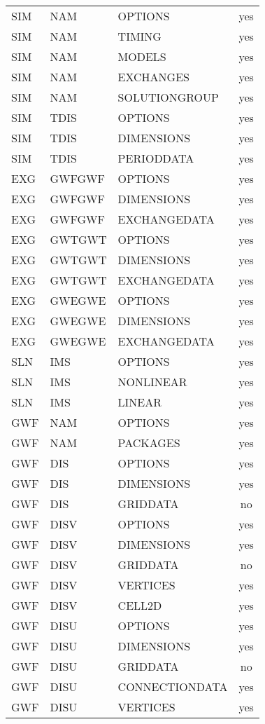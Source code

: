 \begin{longtable}{p{1.5cm} p{1.5cm} p{3cm} c}
\hline
SIM & NAM & OPTIONS & yes \\ 
SIM & NAM & TIMING & yes \\ 
SIM & NAM & MODELS & yes \\ 
SIM & NAM & EXCHANGES & yes \\ 
SIM & NAM & SOLUTIONGROUP & yes \\ 
\hline
SIM & TDIS & OPTIONS & yes \\ 
SIM & TDIS & DIMENSIONS & yes \\ 
SIM & TDIS & PERIODDATA & yes \\ 
\hline
EXG & GWFGWF & OPTIONS & yes \\ 
EXG & GWFGWF & DIMENSIONS & yes \\ 
EXG & GWFGWF & EXCHANGEDATA & yes \\ 
\hline
EXG & GWTGWT & OPTIONS & yes \\ 
EXG & GWTGWT & DIMENSIONS & yes \\ 
EXG & GWTGWT & EXCHANGEDATA & yes \\ 
\hline
EXG & GWEGWE & OPTIONS & yes \\ 
EXG & GWEGWE & DIMENSIONS & yes \\ 
EXG & GWEGWE & EXCHANGEDATA & yes \\ 
\hline
SLN & IMS & OPTIONS & yes \\ 
SLN & IMS & NONLINEAR & yes \\ 
SLN & IMS & LINEAR & yes \\ 
\hline
GWF & NAM & OPTIONS & yes \\ 
GWF & NAM & PACKAGES & yes \\ 
\hline
GWF & DIS & OPTIONS & yes \\ 
GWF & DIS & DIMENSIONS & yes \\ 
GWF & DIS & GRIDDATA & no \\ 
\hline
GWF & DISV & OPTIONS & yes \\ 
GWF & DISV & DIMENSIONS & yes \\ 
GWF & DISV & GRIDDATA & no \\ 
GWF & DISV & VERTICES & yes \\ 
GWF & DISV & CELL2D & yes \\ 
\hline
GWF & DISU & OPTIONS & yes \\ 
GWF & DISU & DIMENSIONS & yes \\ 
GWF & DISU & GRIDDATA & no \\ 
GWF & DISU & CONNECTIONDATA & yes \\ 
GWF & DISU & VERTICES & yes \\ 

\end{longtable}
